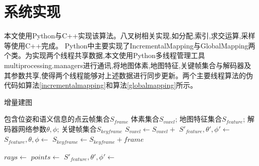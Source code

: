\section{系统实现}\label{implement}
本文使用Python与C++实现该算法。八叉树相关实现,如分配,索引,求交运算,采样等使用C++完成。 Python中主要实现了IncrementalMapping与GlobalMapping两个类。为实现两个线程共享数据,本文使用Python多线程管理工具multiprocessing.managers进行通讯,将地图体素,地图特征,关键帧集合与解码器及其参数共享,使得两个线程能够对上述数据进行同步更新。两个主要线程算法的伪代码如算法\ref{incrementalmapping}和算法\ref{globalmapping}所示。
\begin{algorithm}
    \caption{增量建图}\label{incrementalmapping}
    \begin{algorithmic}[1]
      \Require
        包含位姿和语义信息的点云帧集合$S_{frame}$
      \Ensure
        体素集合$S_{voxel}$;
        地图特征集合$S_{feature}$;
        解码器网络参数$\theta, \phi$;
        关键帧集合$S_{keyframe}$
      \State $S_{voxel}\gets S_{voxel}+$ 
      \State $S'_{feature}, \theta', \phi'\gets$
      \State $S_{feature},\theta,\phi\gets$
      \State $S_{keyframe}\gets S_{keyframe}+frame$
      \EndIf
      \EndFor
      \State {}
      \EndFunction

      \State $rays \gets$
      \State $points\gets$
      \State {}
      \State $S'_{feature}, \theta', \phi'\gets$
      \EndIf
      \EndFor
      \State {}
      \EndFunction
    \end{algorithmic}
\end{algorithm}

